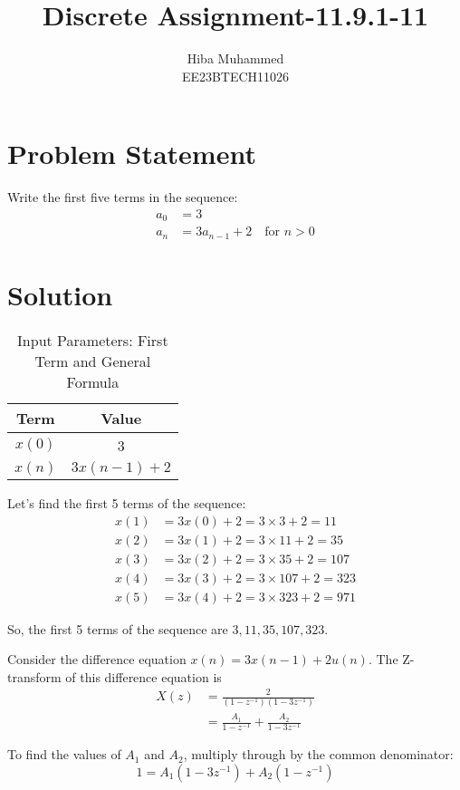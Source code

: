 \documentclass[12pt]{article}
\title{Discrete Assignment-11.9.1-11}
\author{Hiba Muhammed \\
        EE23BTECH11026}
\date{} %
\begin{document}
\maketitle

\section*{Problem Statement}
Write the first five terms in the sequence:
\begin{align*}
a_{0}  &= 3 \\
a_{n}  &= 3a_{n-1} + 2 \quad \text{for } n > 0
\end{align*}

\section*{Solution}
\begin{table}[h]
  \centering
  \caption{Input Parameters: First Term and General Formula}
  \begin{tabular}{|c|c|}
    \hline
    \textbf{Term} & \textbf{Value} \\
    \hline
    \(x(0)\) & 3 \\
    \(x(n)\) & \(3x(n-1) + 2\) \\
    \hline
  \end{tabular}
\end{table}

Let's find the first 5 terms of the sequence:
\begin{align*}
x(1) &= 3x(0) + 2 = 3 \times 3 + 2 = 11 \\
x(2) &= 3x(1) + 2 = 3 \times 11 + 2 = 35 \\
x(3) &= 3x(2) + 2 = 3 \times 35 + 2 = 107 \\
x(4) &= 3x(3) + 2 = 3 \times 107 + 2 = 323 \\
x(5) &= 3x(4) + 2 = 3 \times 323 + 2 = 971 
\end{align*}

So, the first 5 terms of the sequence are \(3, 11, 35, 107, 323\).

Consider the difference equation \(x(n) = 3x(n-1) + 2u(n)\). The Z-transform of this difference equation is
\begin{align*}
X(z) &= \frac{2}{(1 - z^{-1})(1 - 3z^{-1})} \\
&= \frac{A_1}{1 - z^{-1}} + \frac{A_2}{1 - 3z^{-1}}
\end{align*}

To find the values of \(A_1\) and \(A_2\), multiply through by the common denominator:
\begin{equation}
1 = A_1(1-3z^{-1}) + A_2(1-z^{-1})
\end{equation}
\end{document}
